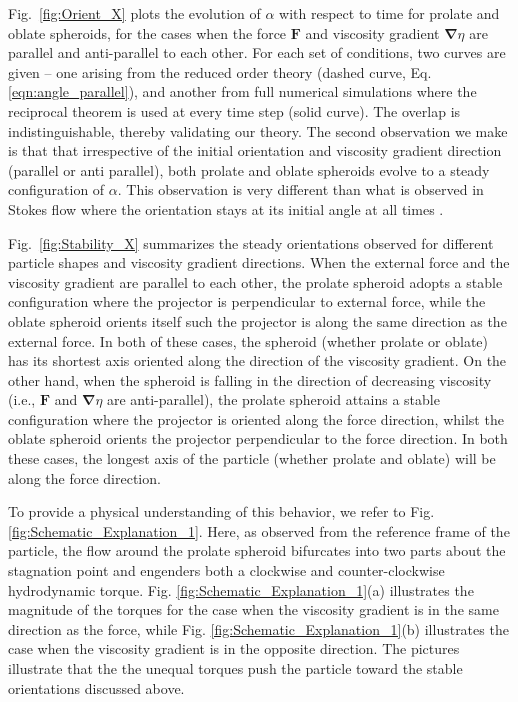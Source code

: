 \documentclass{jfm}
\begin{document}
Fig.~\ref{fig:Orient_X} plots the evolution of $\alpha$ with respect to time for prolate and oblate spheroids, for the cases when the force $\boldsymbol{F}$ and viscosity gradient $\boldsymbol{\nabla} \eta$ are parallel and anti-parallel to each other. For each set of conditions, two curves are given – one arising from the reduced order theory (dashed curve, Eq. \eqref{eqn:angle_parallel}), and another from full numerical simulations where the reciprocal theorem is used at every time step (solid curve).  The overlap is indistinguishable, thereby validating our theory. The second observation we make is that that irrespective of the initial orientation and viscosity gradient direction (parallel or anti parallel), both prolate and oblate spheroids evolve to a steady configuration of $\alpha$.  This observation is very different than what is observed in Stokes flow where the orientation stays at its initial angle at all times \citep{Leal2007}.

Fig.~\ref{fig:Stability_X} summarizes the steady orientations observed for different particle shapes and viscosity gradient directions. When the external force and the viscosity gradient are parallel to each other, the prolate spheroid adopts a stable configuration where the projector is perpendicular to external force, while the oblate spheroid orients itself such the projector is along the same direction as the external force. In both of these cases, the spheroid (whether prolate or oblate) has its shortest axis oriented along the direction of the viscosity gradient. On the other hand, when the spheroid is falling in the direction of decreasing viscosity (i.e., $\boldsymbol{F}$ and $\boldsymbol{\nabla}\eta$ are anti-parallel), the prolate spheroid attains a stable configuration where the projector is oriented along the force direction, whilst the oblate spheroid orients the projector perpendicular to the force direction. In both these cases, the longest axis of the particle (whether prolate and oblate) will be along the force direction.  

To provide a physical understanding of this behavior, we refer to Fig. \ref{fig:Schematic_Explanation_1}. Here, as observed from the reference frame of the particle, the flow around the prolate spheroid bifurcates into two parts about the stagnation point and engenders both a clockwise and counter-clockwise hydrodynamic torque. Fig. \ref{fig:Schematic_Explanation_1}(a) illustrates the magnitude of the torques for the case when the viscosity gradient is in the same direction as the force, while Fig. \ref{fig:Schematic_Explanation_1}(b) illustrates the case when the viscosity gradient is in the opposite direction.  The pictures illustrate that the the unequal torques push the particle toward the stable orientations discussed above.  
\end{document}
